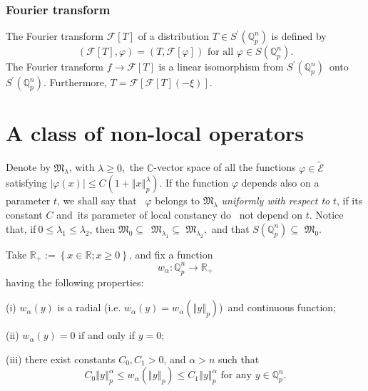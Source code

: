 \documentclass{amsart}\usepackage{amsfonts}
\theoremstyle{plain}
\numberwithin{equation}{section}
\begin{document}
\subsubsection{Fourier transform}

The Fourier transform $\mathcal{F}\left[  T\right]  $ of a distribution $T\in
S^{\prime}\left(  \mathbb{Q}_{p}^{n}\right)  $ is defined by\[
\left(  \mathcal{F}\left[  T\right]  ,\varphi\right)  =\left(  T,\mathcal{F}\left[  \varphi\right]  \right)  \text{ for all }\varphi\in S\left(
\mathbb{Q}_{p}^{n}\right)  \text{.}\]
The Fourier transform $f\rightarrow\mathcal{F}\left[  T\right]  $ is a linear
isomorphism from $S^{\prime}\left(  \mathbb{Q}_{p}^{n}\right)  $\ onto
$S^{\prime}\left(  \mathbb{Q}_{p}^{n}\right)  $. Furthermore, $T=\mathcal{F}\left[  \mathcal{F}\left[  T\right]  \left(  -\xi\right)  \right]  $.

\section{\label{Sect2}A class of non-local operators}

Denote by $\mathcal{\mathfrak{M}}_{\lambda}$, with $\lambda\geq0$,\ the
$\mathbb{C}$-vector space of all the functions $\varphi\in\widetilde
{\mathcal{E}}$ satisfying $\left\vert \varphi(x)\right\vert \leq
C(1+\left\Vert x\right\Vert _{p}^{\lambda})$. If the function $\varphi$
depends also on a parameter $t$, we shall say that \ $\varphi$ belongs to
$\mathcal{\mathfrak{M}}_{\lambda}$ \textit{uniformly with respect to} $t$, if
its constant $C$ and\ its parameter of local constancy do \ not depend on $t$.
Notice that, if$\ 0\leq\lambda_{1}\leq\lambda_{2}$, then
$\mathcal{\mathfrak{M}}_{0}\subseteq$\ $\mathcal{\mathfrak{M}}_{\lambda_{1}}\subseteq$ $\mathcal{\mathfrak{M}}_{\lambda_{2}},$ and that $S(\mathbb{Q}_{p}^{n})\subseteq$ $\mathcal{\mathfrak{M}}_{0}$.

Take $\mathbb{R}_{+}:=\left\{  x\in\mathbb{R};x\geq0\right\}  $, and fix a
function\[
w_{\alpha}:\mathbb{Q}_{p}^{n}\rightarrow\mathbb{R}_{+}\]
having the following properties:

\noindent(i) $w_{\alpha}\left(  y\right)  $ is a radial (i.e. $w_{\alpha
}\left(  y\right)  =w_{\alpha}\left(  \left\Vert y\right\Vert _{p}\right)
$)\ and continuous function;

\noindent(ii) $w_{\alpha}\left(  y\right)  =0$ if and only if $y=0$;

\noindent(iii) there exist constants $C_{0},C_{1}>0$, and $\alpha>n$ such
that
\[
C_{0}\left\Vert y\right\Vert _{p}^{\alpha}\leq w_{\alpha}(\left\Vert
y\right\Vert _{p})\leq C_{1}\left\Vert y\right\Vert _{p}^{\alpha}\text{ for
any }y\in\mathbb{Q}_{p}^{n}.
\]
\end{document}
